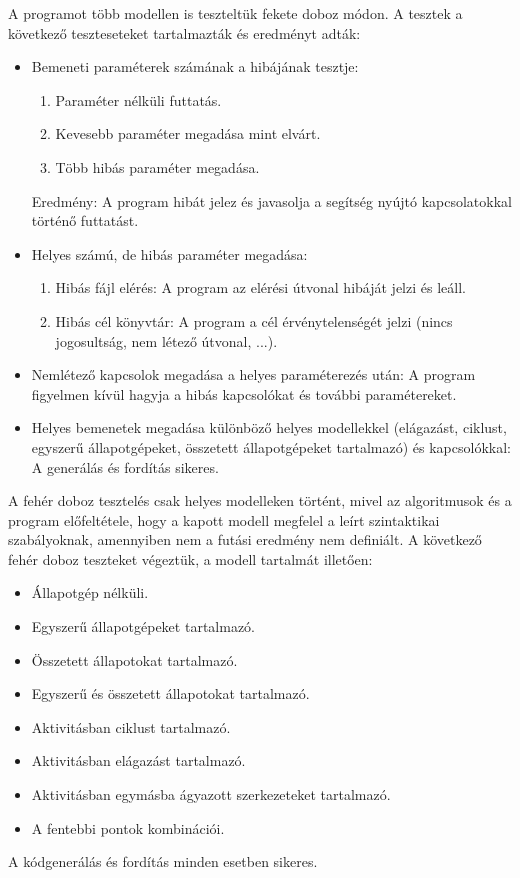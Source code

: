 \documentclass[a4paper,12pt]{report}
\begin{document}
A programot több modellen is teszteltük fekete doboz módon. A tesztek a következő teszteseteket tartalmazták és eredményt adták:
\begin{itemize}
\item Bemeneti paraméterek számának a hibájának tesztje:
\begin{enumerate}
\item Paraméter nélküli futtatás.
\item Kevesebb paraméter megadása mint elvárt.
\item Több hibás paraméter megadása.
\end{enumerate}
Eredmény: A program hibát jelez és javasolja a segítség nyújtó kapcsolatokkal történő futtatást.

\item Helyes számú, de hibás paraméter megadása:
\begin{enumerate}
\item Hibás fájl elérés: A program az elérési útvonal hibáját jelzi és leáll.
\item Hibás cél könyvtár: A program a cél érvénytelenségét jelzi (nincs jogosultság, nem létező útvonal, ...).
\end{enumerate}

\item Nemlétező kapcsolok megadása a helyes paraméterezés után: A program figyelmen kívül hagyja a hibás kapcsolókat és további paramétereket.
\item Helyes bemenetek megadása különböző helyes modellekkel (elágazást, ciklust, egyszerű állapotgépeket, összetett állapotgépeket tartalmazó) és kapcsolókkal: A generálás és fordítás sikeres.
\end{itemize}

A fehér doboz tesztelés csak helyes modelleken történt, mivel az algoritmusok és a program előfeltétele, hogy a kapott modell megfelel a leírt szintaktikai szabályoknak, amennyiben nem a futási eredmény nem definiált.
A következő fehér doboz teszteket végeztük, a modell tartalmát illetően:
\begin{itemize}
\item Állapotgép nélküli.
\item Egyszerű állapotgépeket tartalmazó.
\item Összetett állapotokat tartalmazó.
\item Egyszerű és összetett állapotokat tartalmazó.
\item Aktivitásban ciklust tartalmazó.
\item Aktivitásban elágazást tartalmazó.
\item Aktivitásban egymásba ágyazott szerkezeteket tartalmazó.
\item A fentebbi pontok kombinációi.
\end{itemize} 
A kódgenerálás és fordítás minden esetben sikeres.
\end{document}
